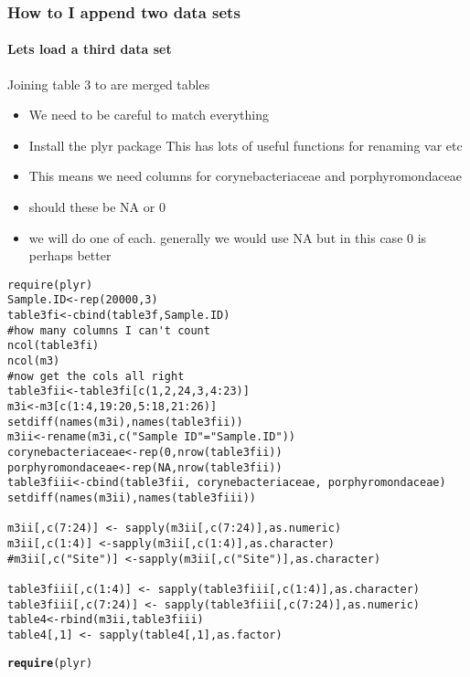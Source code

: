 \documentclass{article}\usepackage[]{graphicx}\usepackage[]{color}
\makeatletter
\newcommand{\hlstd}[1]{\textcolor[rgb]{0.345,0.345,0.345}{#1}}%
\newcommand{\hlkwd}[1]{\textcolor[rgb]{0.737,0.353,0.396}{\textbf{#1}}}%
\newenvironment{kframe}{%
 \def\at@end@of@kframe{}%
 \ifinner\ifhmode%
  \def\at@end@of@kframe{\end{minipage}}%
  \begin{minipage}{\columnwidth}%
 \fi\fi%
 \def\FrameCommand##1{\hskip\@totalleftmargin \hskip-\fboxsep
 \colorbox{shadecolor}{##1}\hskip-\fboxsep
     \hskip-\linewidth \hskip-\@totalleftmargin \hskip\columnwidth}%
 \MakeFramed {\advance\hsize-\width
   \@totalleftmargin\z@ \linewidth\hsize
   \@setminipage}}%
 {\par\unskip\endMakeFramed%
 \at@end@of@kframe}
\newenvironment{knitrout}{}{} %
\makeatother
\begin{document}
\begin{frame}[fragile]
  \frametitle{How to I append two data sets}
  \framesubtitle{Lets load a third data set}
  \begin{block}{Joining table 3 to are merged tables}
  \begin{itemize}
  \item We need to be careful to match everything
  \item Install the plyr package This has lots of useful functions for renaming var etc
  \item This means we need columns for corynebacteriaceae and porphyromondaceae
  \item should these be NA or 0
  \item we will do one of each. generally we would use NA but in this case 0 is perhaps better
 \end{itemize}
  \end{block}
\begin{lstlisting} 
require(plyr)
Sample.ID<-rep(20000,3)
table3fi<-cbind(table3f,Sample.ID)
#how many columns I can't count
ncol(table3fi)
ncol(m3)
#now get the cols all right
table3fii<-table3fi[c(1,2,24,3,4:23)]
m3i<-m3[c(1:4,19:20,5:18,21:26)]
setdiff(names(m3i),names(table3fii))
m3ii<-rename(m3i,c("Sample ID"="Sample.ID"))
corynebacteriaceae<-rep(0,nrow(table3fii))
porphyromondaceae<-rep(NA,nrow(table3fii))
table3fiii<-cbind(table3fii, corynebacteriaceae, porphyromondaceae)
setdiff(names(m3ii),names(table3fiii))

m3ii[,c(7:24)] <- sapply(m3ii[,c(7:24)],as.numeric)
m3ii[,c(1:4)] <-sapply(m3ii[,c(1:4)],as.character)
#m3ii[,c("Site")] <-sapply(m3ii[,c("Site")],as.character)

table3fiii[,c(1:4)] <- sapply(table3fiii[,c(1:4)],as.character)
table3fiii[,c(7:24)] <- sapply(table3fiii[,c(7:24)],as.numeric)
table4<-rbind(m3ii,table3fiii)
table4[,1] <- sapply(table4[,1],as.factor)
\end{lstlisting}
  
\begin{knitrout}
\color{fgcolor}\begin{kframe}
\begin{alltt}
\hlkwd{require}\hlstd{(plyr)}
\end{alltt}



\end{kframe}
\end{knitrout}
\end{frame}
\end{document}
